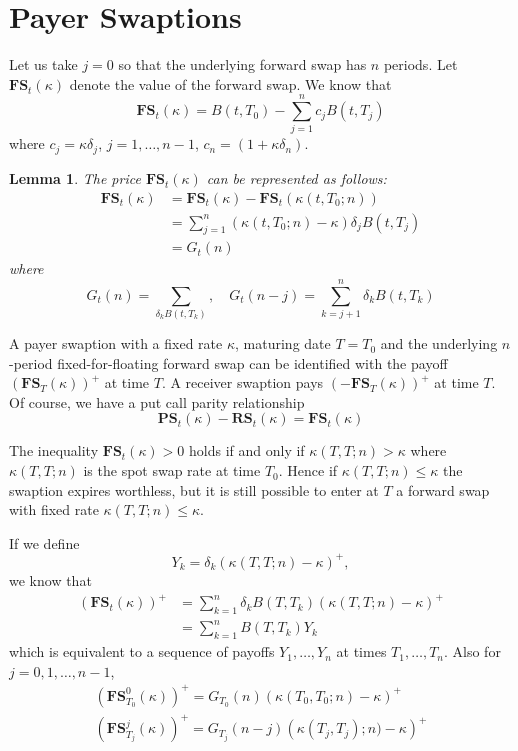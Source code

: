 \documentclass[10pt, oneside, reqno]{amsbook}
\theoremstyle{plain}%
\newtheorem{lem}[thm]{Lemma}
\theoremstyle{definition}
\theoremstyle{remark}
\numberwithin{equation}{chapter}
\begin{document}
\section{Payer Swaptions} %
\label{sec:payer_swaptions}
Let us take $j = 0$ so that the underlying forward swap has $n$ periods.  Let $\mathbf{FS}_t(\kappa)$ denote the value of the forward swap. We know that \[
	\mathbf{FS}_t(\kappa) = B(t, T_0) - \sum_{j=1}^n c_j B(t, T_j)
\] where $c_j = \kappa \delta_j$, $j = 1, \dots, n-1$, $c_n = (1 + \kappa \delta_n)$.  

\begin{lem}
	The price $\mathbf{FS}_t(\kappa)$ can be represented as follows: \begin{align*}
		\mathbf{FS}_t(\kappa) &= \mathbf{FS}_t(\kappa) - \mathbf{FS}_t(\kappa(t, T_0; n)) \\
					&= \sum_{j=1}^n \left( \kappa(t, T_0; n) - \kappa \right) \delta_j B(t, T_j) \\
					&= G_t(n)
	\end{align*}  where \[
		G_t(n) = \sum_{\delta_k B(t, T_k)}, \quad G_t(n-j) = \sum_{k=j+1}^n \delta_k B(t, T_k)
	\]  
\end{lem}

A payer swaption with a fixed rate $\kappa$, maturing date $T = T_0$ and the underlying $n$-period fixed-for-floating forward swap can be identified with the payoff $\left(\mathbf{FS}_T(\kappa) \right)^+$ at time $T$.  A receiver swaption pays $\left(-\mathbf{FS}_T(\kappa) \right)^+$ at time $T$.  Of course, we have a put call parity relationship \[
	\mathbf{PS}_t(\kappa) - \mathbf{RS}_t(\kappa) = \mathbf{FS}_t(\kappa)
\]

The inequality $\mathbf{FS}_t(\kappa) > 0$ holds if and only if $\kappa(T, T; n) > \kappa$ where $\kappa(T, T; n)$ is the spot swap rate at time $T_0$. Hence if $\kappa(T, T; n) \leq \kappa$ the swaption expires worthless, but it is still possible to enter at $T$ a forward swap with fixed rate $\kappa(T, T; n) \leq \kappa$.

If we define \[
	Y_k = \delta_k \left( \kappa(T, T; n) - \kappa \right)^+,
\] we know that \begin{align*}
	\left( \mathbf{FS}_t(\kappa) \right)^+ &= \sum_{k=1}^n \delta_k B(T, T_k) \left(\kappa(T, T; n) - \kappa \right)^+ \\
	&= \sum_{k=1}^n B(T, T_k) Y_k
\end{align*} which is equivalent to a sequence of payoffs $Y_1, \dots, Y_n$ at times $T_1, \dots, T_n$.  Also for $j = 0, 1, \dots, n-1$, \begin{align*}
	\left( \mathbf{FS}_{T_0}^0 (\kappa) \right)^+ = G_{T_0}(n) \left( \kappa(T_0, T_0; n) - \kappa \right)^+ \\
	\left( \mathbf{FS}_{T_j}^j (\kappa) \right)^+ = G_{T_j} (n-j) \left( \kappa(T_j, T_j) ;n) - \kappa \right)^+
\end{align*}
\end{document}
